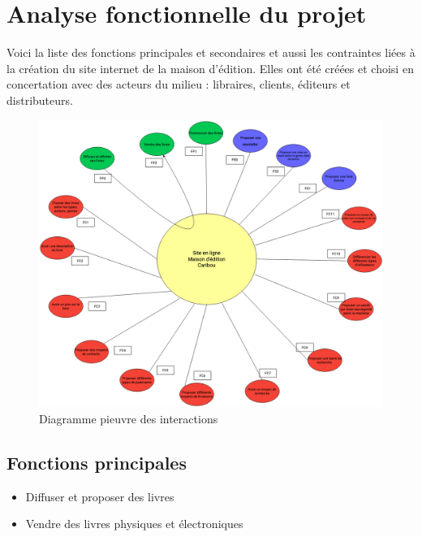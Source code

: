 \documentclass[14pt]{extarticle}
\begin{document}
\section{Analyse fonctionnelle du projet}
Voici la liste des fonctions principales et secondaires et aussi les contraintes liées à la création du site internet de la maison d'édition. Elles ont été créées et choisi en concertation avec des acteurs du milieu : libraires, clients, éditeurs et distributeurs.
\begin{figure}[h]
    \centering
    \includegraphics[width=1\linewidth]{images/diag_pieuvre.png}
    \caption{Diagramme pieuvre des interactions}
\end{figure}
\subsection{Fonctions principales}
\begin{itemize}
    \item Diffuser et proposer des livres
    \item Vendre des livres physiques et électroniques
\end{itemize}
\end{document}
